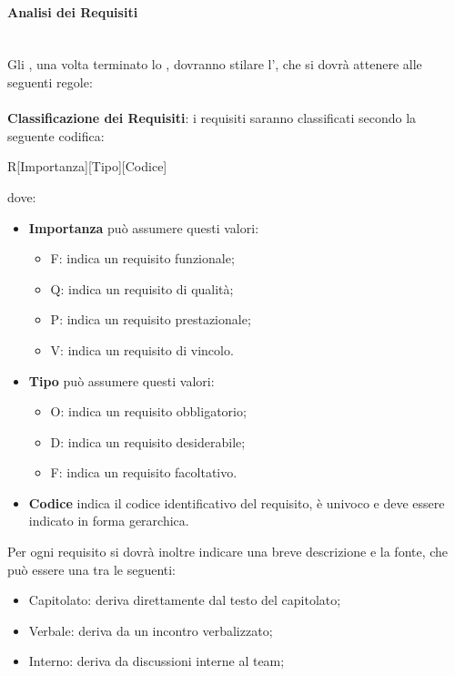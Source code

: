 \paragraph{Analisi dei Requisiti}
	~\\Gli \anas, una volta terminato lo \SdF, dovranno stilare l'\AdR, che si dovrà attenere alle seguenti regole: \\
	~\\ \textbf{Classificazione dei Requisiti}:
	i requisiti saranno classificati secondo la seguente codifica:
		\begin{center}
			R[Importanza][Tipo][Codice]
		\end{center}
	dove:
	\begin{itemize}
		\item \textbf{Importanza} può assumere questi valori:
			\begin{itemize}
				\item F: indica un requisito funzionale;
				\item Q: indica un requisito di qualità;
				\item P: indica un requisito prestazionale;
				\item V: indica un requisito di vincolo.
			\end{itemize}
		\item \textbf{Tipo} può assumere questi valori:
			\begin{itemize}
				\item O: indica un requisito obbligatorio;
				\item D: indica un requisito desiderabile;
				\item F: indica un requisito facoltativo.
			\end{itemize}
		\item \textbf{Codice} indica il codice identificativo del requisito, è univoco e deve essere indicato in
		forma gerarchica.
	\end{itemize}
	Per ogni requisito si dovrà inoltre indicare una breve descrizione e la fonte, che può essere una tra le seguenti:
		\begin{itemize}
		\item Capitolato: deriva direttamente dal testo del capitolato;
		\item Verbale: deriva da un incontro verbalizzato;
		\item Interno: deriva da discussioni interne al team;
		\end{itemize}
	
